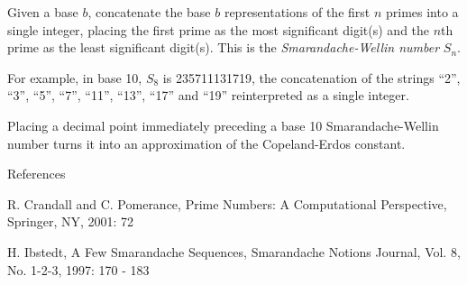 \documentclass[12pt]{article}
\begin{document}
Given a base $b$, concatenate the base $b$ representations of the first $n$ primes into a single integer, placing the first prime as the most significant digit(s) and the $n$th prime as the least significant digit(s). This is the {\em Smarandache-Wellin number} $S_n$.

For example, in base 10, $S_8$ is 235711131719, the concatenation of the strings ``2'', ``3'', ``5'', ``7'', ``11'', ``13'', ``17'' and ``19'' reinterpreted as a single integer.

Placing a decimal point immediately preceding a base 10 Smarandache-Wellin number turns it into an approximation of the Copeland-Erdos constant.

References

R. Crandall and C. Pomerance, Prime Numbers: A Computational Perspective, Springer, NY, 2001: 72

H. Ibstedt, A Few Smarandache Sequences, Smarandache Notions Journal, Vol. 8, No. 1-2-3, 1997: 170 - 183
\end{document}
